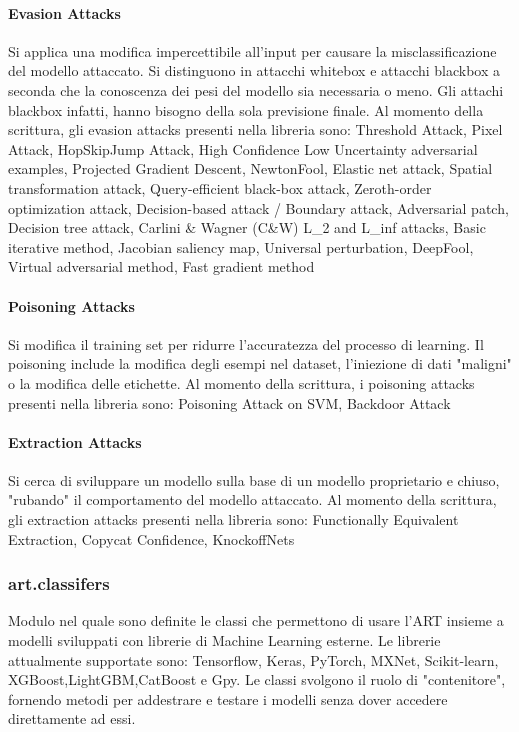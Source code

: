 \paragraph{Evasion Attacks}
Si applica una modifica impercettibile all'input per causare la misclassificazione  del modello attaccato. Si distinguono in attacchi whitebox  e attacchi blackbox a seconda che la conoscenza dei pesi del modello
sia necessaria o meno. Gli attachi blackbox infatti, hanno bisogno della sola previsione finale. Al momento della scrittura, gli evasion attacks presenti nella libreria sono:
 Threshold Attack, Pixel Attack, HopSkipJump Attack, High Confidence Low Uncertainty adversarial examples, Projected Gradient Descent, NewtonFool, Elastic net attack,
Spatial transformation attack, Query-efficient black-box attack, Zeroth-order optimization attack, Decision-based attack / Boundary attack, Adversarial patch, Decision tree attack,
Carlini \& Wagner   (C\&W) L\_2 and L\_inf attacks, Basic iterative method, Jacobian saliency map, Universal perturbation, DeepFool, Virtual adversarial method, Fast gradient method

\paragraph{Poisoning Attacks}
Si modifica il training set per ridurre l'accuratezza del processo di learning. Il poisoning include la modifica degli esempi nel dataset, l'iniezione di dati "maligni" o la modifica
delle etichette. Al momento della scrittura, i poisoning attacks presenti nella libreria sono: Poisoning Attack on SVM, Backdoor Attack

\paragraph{Extraction Attacks} Si cerca di sviluppare un modello sulla base di un modello proprietario e chiuso, "rubando" il comportamento del modello attaccato. Al momento della scrittura, gli extraction attacks presenti nella libreria sono: 
Functionally Equivalent Extraction, Copycat Confidence, KnockoffNets

\subsubsection{art.classifers}
Modulo nel quale sono definite le classi che permettono di usare l'ART insieme a modelli sviluppati con librerie di Machine Learning esterne.  Le librerie attualmente supportate sono: 
Tensorflow, Keras, PyTorch, MXNet, Scikit-learn, XGBoost,LightGBM,CatBoost e Gpy. Le classi svolgono il ruolo di "contenitore", fornendo metodi per addestrare e testare i modelli senza dover accedere direttamente
ad essi.
